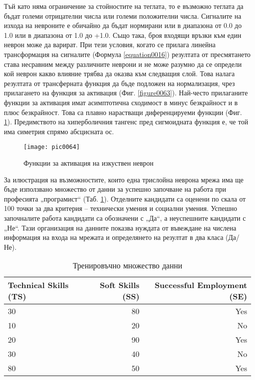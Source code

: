 Тъй като няма ограничение за стойностите на теглата, то е възможно теглата да бъдат големи отрицателни числа или големи положителни числа. Сигналите на изхода на невроните е обичайно да бъдат нормирани или в диапазона от 0.0 до 1.0 или в диапазона от 1.0 до +1.0. Също така, броя входящи връзки към един неврон може да варират. При тези условия, когато се прилага линейна трансформация на сигналите (Формула \ref{equation0016}) резултата от пресмятането става несравним между различните неврони и не може разумно да се определи кой неврон какво влияние трябва да оказва към следващия слой. Това налага резултата от трансферната функция да бъде подложен на нормализация, чрез прилагането на функция за активация (Фиг. \ref{figure0063}). Най-често прилаганите функции за активация имат асимптотична сходимост в минус безкрайност и в плюс безкрайност. Това са плавно нарастващи диференцируеми функции (Фиг. \ref{figure0064}). Предимството на хиперболичния тангенс пред сигмоидната функция е, че той има симетрия спрямо абсцисната ос.

\begin{figure}[h!]
  \centering
  \texttt{[image: pic0064]}
  \caption{Функции за активация на изкуствен неврон}
\label{figure0064}
\end{figure}
\FloatBarrier

За илюстрация на възможностите, които една трислойна неврона мрежа има ще бъде използвано множество от данни за успешно започване на работа при професията „програмист“ (Таб. \ref{table0007}). Отделните кандидати са оценени по скала от 100 точки за два критерия – технически умения и социални умения. Успешно започналите работа кандидати са обозначени с „Да“, а неуспешните кандидати с „Не“. Тази организация на данните показва нуждата от въвеждане на числена информация на входа на мрежата и определянето на резултат в два класа (Да/Не).

\begin{table}[h!]
\centering
\begin{tabular}{|l|r|r|} 
	\rowcolor{lightgray}
	\hline
	Technical Skills (TS) & Soft Skills (SS) & Successful Employment (SE) \\
	\hline\hline
	30 & 80 & Yes \\
	\hline
	10 & 20 & No \\
	\hline
	20 & 90 & Yes \\
	\hline
	30 & 40 & No \\
	\hline
	80 & 50 & Yes \\
	\hline
\end{tabular}
\caption{Тренировъчно множество данни}
\label{table0007}
\end{table}

